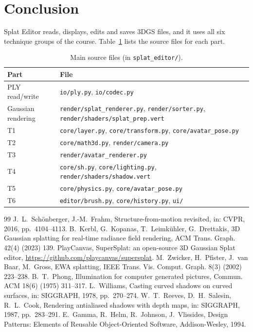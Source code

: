 \documentclass[9pt,twocolumn,a4paper]{extarticle}
\newcommand{\code}[1]{\texttt{#1}}
\begin{document}
\section{Conclusion}
\label{chap:end}
Splat Editor reads, displays, edits and saves 3DGS files, and it uses all six technique groups of the course. Table~\ref{tab:src} lists the source files for each part.

\begin{table}[H]
\centering
\caption{Main source files (in \code{splat\_editor/}).}
\label{tab:src}
\footnotesize
\begin{tabular}{@{}p{2.2cm}>{\raggedright\arraybackslash}p{5.5cm}@{}}
\toprule
Part & File \\
\midrule
PLY read/write & \mbox{\code{io/ply.py}}, \mbox{\code{io/codec.py}} \\
Gaussian rendering & \mbox{\code{render/splat\_renderer.py}}, \mbox{\code{render/sorter.py}}, \mbox{\code{render/shaders/splat\_prep.vert}} \\
T1 & \mbox{\code{core/layer.py}}, \mbox{\code{core/transform.py}}, \mbox{\code{core/avatar\_pose.py}} \\
T2 & \mbox{\code{core/math3d.py}}, \mbox{\code{render/camera.py}} \\
T3 & \mbox{\code{render/avatar\_renderer.py}} \\
T4 & \mbox{\code{core/sh.py}}, \mbox{\code{core/lighting.py}}, \mbox{\code{render/shaders/shadow.vert}} \\
T5 & \mbox{\code{core/physics.py}}, \mbox{\code{core/avatar\_pose.py}} \\
T6 & \mbox{\code{editor/brush.py}}, \mbox{\code{core/history.py}}, \mbox{\code{ui/}} \\
\bottomrule
\end{tabular}
\end{table}

\begin{thebibliography}{99}\footnotesize\itemsep0pt\parskip0pt
 J.~L.~Sch{\"o}nberger, J.-M.~Frahm, Structure-from-motion revisited, in: CVPR, 2016, pp.~4104--4113.
 B.~Kerbl, G.~Kopanas, T.~Leimk{\"u}hler, G.~Drettakis, 3D Gaussian splatting for real-time radiance field rendering, ACM Trans. Graph. 42(4) (2023) 139.
 PlayCanvas, SuperSplat: an open-source 3D Gaussian Splat editor, \url{https://github.com/playcanvas/supersplat}.
 M.~Zwicker, H.~Pfister, J.~van Baar, M.~Gross, EWA splatting, IEEE Trans. Vis. Comput. Graph. 8(3) (2002) 223--238.
 B.~T.~Phong, Illumination for computer generated pictures, Commun. ACM 18(6) (1975) 311--317.
 L.~Williams, Casting curved shadows on curved surfaces, in: SIGGRAPH, 1978, pp.~270--274.
 W.~T.~Reeves, D.~H.~Salesin, R.~L.~Cook, Rendering antialiased shadows with depth maps, in: SIGGRAPH, 1987, pp.~283--291.
 E.~Gamma, R.~Helm, R.~Johnson, J.~Vlissides, Design Patterns: Elements of Reusable Object-Oriented Software, Addison-Wesley, 1994.
\end{thebibliography}
\end{document}
